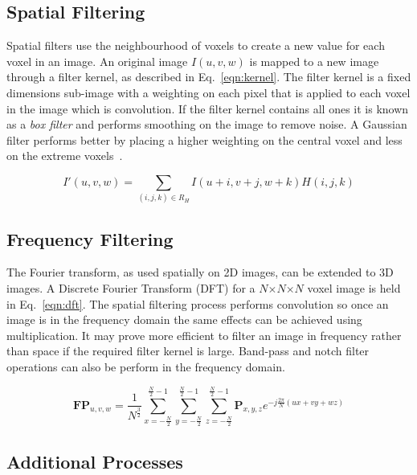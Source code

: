 \documentclass[journal]{IEEEtran}
\begin{document}
\subsection{Spatial Filtering}
Spatial filters use the neighbourhood of voxels to create a new value for each voxel in an image. 
An original image $I(u,v,w)$ is mapped to a new image through a filter kernel, as described in Eq.~\ref{eqn:kernel}.
The filter kernel is a fixed dimensions sub-image with a weighting on each pixel that is applied to each voxel in the image which is convolution.
If the filter kernel contains all ones it is known as a \emph{box filter} and performs smoothing on the image to remove noise.
A Gaussian filter performs better by placing a higher weighting on the central voxel and less on the extreme voxels~\cite{lohmann1998volumetric}.


\begin{equation}
	I'(u,v,w) = \sum\limits_{(i,j,k) \in R_H} I(u + i,v + j, w + k)H(i,j,k)
	\label{eqn:kernel} 
\end{equation}



\subsection{Frequency Filtering}
The Fourier transform, as used spatially on 2D images, can be extended to 3D images.
A Discrete Fourier Transform (DFT) for a $N$$\times$$N$$\times$$N$ voxel image is held in Eq.~\ref{eqn:dft}.
The spatial filtering process performs convolution so once an image is in the frequency domain the same effects can be achieved using multiplication.
It may prove more efficient to filter an image in frequency rather than space if the required filter kernel is large.
Band-pass and notch filter operations can also be perform in the frequency domain.

\begin{equation}
	\textbf{FP}_{u,v,w} = \frac{1}{N^{\frac{3}{2}}} \sum\limits_{x=-\frac{N}{2}}^{\frac{N}{2}-1}\sum\limits_{y=-\frac{N}{2}}^{\frac{N}{2}-1}\sum\limits_{z=-\frac{N}{2}}^{\frac{N}{2}-1}\textbf{P}_{x,y,z}e^{-j\frac{2\pi}{N}(ux + vy + wz)}
	\label{eqn:dft} 
\end{equation}



\subsection{Additional Processes}
\end{document}

